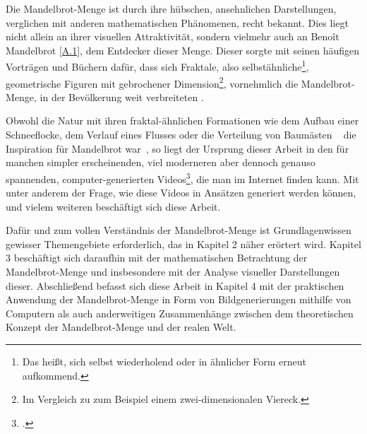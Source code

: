 
Die Mandelbrot-Menge ist durch ihre hübschen, ansehnlichen Darstellungen,
verglichen mit anderen mathematischen Phänomenen, recht bekannt.
Dies liegt nicht allein an ihrer visuellen Attraktivität,
sondern vielmehr auch an Benoît Mandelbrot \hyperref[app:1]{[A.1]},
dem Entdecker dieser Menge.
Dieser sorgte mit seinen häufigen Vorträgen und Büchern dafür, dass sich Fraktale,
also selbstähnliche\footnote{
  Das heißt, sich selbst wiederholend oder in ähnlicher Form erneut aufkommend.
}, geometrische Figuren mit gebrochener Dimension\footnote{
  Im Vergleich zu zum Beispiel einem zwei-dimensionalen Viereck.
},
vornehmlich die Mandelbrot-Menge, in der Bevölkerung weit verbreiteten
\cite[Vgl. letzten Absatz]{ibm_fractal_2011}.

Obwohl die Natur mit ihren fraktal-ähnlichen Formationen wie dem Aufbau einer
Schneeflocke, dem Verlauf eines Flusses oder die Verteilung von Baumästen
~\cite{nnart_fractals_nodate} die Inspiration für Mandelbrot war~\cite{zink_kosmische_2014},
so liegt der Ursprung dieser Arbeit in den für
manchen simpler erscheinenden, viel moderneren aber dennoch genauso spannenden,
computer-generierten Videos\footcite[Vgl. bspw.][]{maths_town_eye_2017},
die man im Internet finden kann.
Mit unter anderem der Frage, wie diese Videos in Ansätzen generiert werden können,
und vielem weiteren beschäftigt sich diese Arbeit.

Dafür und zum vollen Verständnis der Mandelbrot-Menge ist Grundlagenwissen
gewisser Themengebiete erforderlich, das in Kapitel 2 näher erörtert wird.
Kapitel 3 beschäftigt sich daraufhin mit der mathematischen Betrachtung der
Mandelbrot-Menge und insbesondere mit der Analyse visueller Darstellungen dieser.
Abschließend befasst sich diese Arbeit in Kapitel 4 mit der praktischen Anwendung
der Mandelbrot-Menge in Form von Bildgenerierungen mithilfe von Computern als auch
anderweitigen Zusammenhänge zwischen dem theoretischen Konzept
der Mandelbrot-Menge und der realen Welt.